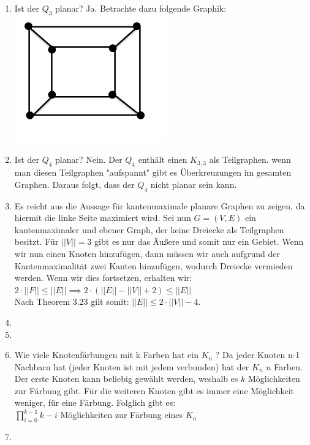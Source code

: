 \begin{enumerate}[label=(\alph*)]
        \item Ist der $Q_3$ planar? 
        Ja. Betrachte dazu folgende Graphik:\\
        \includegraphics{Q3}
        
        \item Ist der $Q_4$ planar?
        Nein. Der $Q_4$ enthält einen $K_{3,3}$ als Teilgraphen. wenn man diesen Teilgraphen "aufspannt" gibt es Überkreuzungen im gesamten Graphen. Daraus folgt, dass der $Q_4$ nicht planar sein kann.
        \item Es reicht aus die Aussage für kantenmaximale planare Graphen zu zeigen, da hiermit die linke Seite maximiert wird. Sei nun $G=(V,E)$ ein kantenmaximaler und ebener Graph, der keine Dreiecke als Teilgraphen besitzt. Für $||V||=3$ gibt es nur das Äußere und somit nur ein Gebiet. Wenn wir nun einen Knoten hinzufügen, dann müssen wir auch aufgrund der Kantenmaximalität zwei Kanten hinzufügen, wodurch Dreiecke vermieden werden.  Wenn wir dies fortsetzen, erhalten wir: \\ 
        $ 2 \cdot ||F|| \le ||E||\implies 2 \cdot \left(||E|| - ||V|| + 2 \right) \le ||E||$ \\ 
        Nach Theorem 3.23 gilt somit:
        $||E|| \le 2 \cdot ||V|| - 4 $. 
        
        \item
        
        \item
        \item Wie viele Knotenfärbungen mit k Farben hat ein $K_n$ ?
        Da jeder Knoten n-1 Nachbarn hat (jeder Knoten ist mit jedem verbunden) hat der $K_n$ $n$ Farben. Der erste Knoten kann beliebig gewählt werden, weshalb es $k$ Möglichkeiten zur Färbung gibt. Für die weiteren Knoten gibt es immer eine Möglichkeit weniger, für eine Färbung. Folglich gibt es: \\
        $\prod_{i=0}^{k-1} k - i$ Möglichkeiten zur Färbung eines $K_n$
          
        \item
        
    \end{enumerate}
